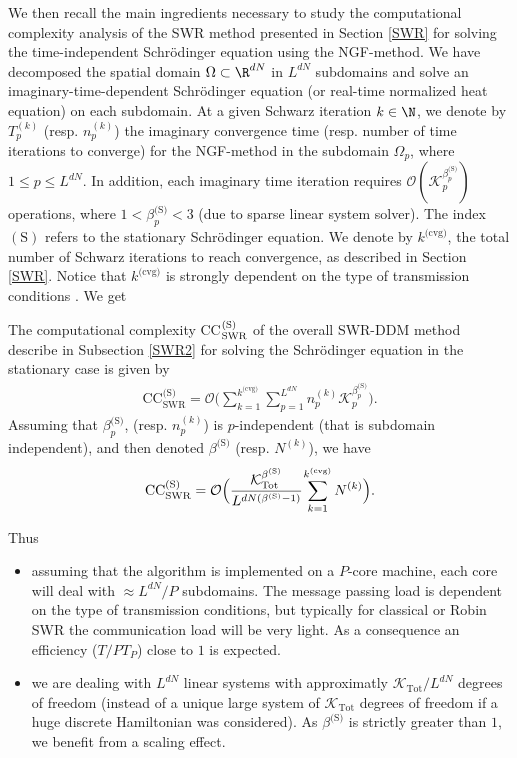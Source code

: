  We then recall the main ingredients necessary to study the computational complexity analysis of the SWR method presented in Section \ref{SWR} for solving the time-independent Schr\"odinger equation using the NGF-method. We have decomposed the spatial domain $\Omega \subset \R^{dN}$ in $L^{dN}$ subdomains and solve an imaginary-time-dependent Schr\"odinger equation (or real-time normalized heat equation) on each subdomain. At a given Schwarz iteration $k \in \N$, we denote by $T^{(k)}_{p}$ (resp. $n_{p}^{(k)}$) the imaginary convergence time (resp. number of time iterations to converge) for the NGF-method in the subdomain $\Omega_{p}$, where $1\leq p \leq L^{dN}$. In addition, each imaginary time iteration requires $\mathcal{O}(\mathcal{K}_{p}^{\beta^{\textrm{(S)}}_p})$ operations, where $1 < \beta^{\textrm{(S)}}_p <  3$ (due to sparse linear system solver). The index $(\textrm{S})$ refers to the stationary Schr\"odinger equation. We denote by $k^{\textrm{(cvg)}}$, the total number of Schwarz iterations to reach convergence, as described in Section \ref{SWR}. Notice that $k^{\textrm{(cvg)}}$ is  strongly dependent on the type of transmission conditions \cite{lorin-TBS2}. We get
\begin{prop} 
The computational complexity CC$^{\textrm{\textrm{(S)}}}_{\textrm{SWR}}$ of the overall SWR-DDM method describe in Subsection \ref{SWR2} for solving the Schr\"odinger equation in the stationary case is given by
\begin{eqnarray}\label{CC2} 
\textrm{CC}^{\textrm{(S)}}_{\textrm{SWR}} = \mathcal{O}\Big(\sum_{k=1}^{k^{\textrm{(cvg)}}}\sum_{p=1}^{L^{dN}}n_{p}^{(k)}\mathcal{K}_p^{\beta^{\textrm{(S)}}_p}\Big).
\end{eqnarray}
Assuming that $\beta^{\textrm{(S)}}_p$, (resp. $n_{p}^{(k)}$) is $p$-independent (that is subdomain independent),  and then denoted $\beta^{\textrm{(S)}}$ (resp. $N^{(k)}$), we have
\begin{eqnarray*}
\textrm{CC}^{\textrm{(S)}}_{\textrm{SWR}} = \mathcal{O}\Big(\cfrac{\mathcal{K}_{\textrm{Tot}}^{\beta^{\textrm{(S)}}}}{L^{dN(\beta^{\textrm{(S)}}-1)}}\sum_{k=1}^{k^{\textrm{(cvg)}}} N^{(k)}\Big).
\end{eqnarray*}
\end{prop}
Thus
\begin{itemize}
\item assuming that the algorithm is implemented on a $P$-core machine, each core will deal with $\approx L^{dN}/P$ subdomains. The message passing load is dependent on the type of transmission conditions, but typically for classical or Robin SWR the communication load will be very light. As a consequence an efficiency ($T/PT_P$) close to $1$ is expected.
\item we are dealing with $L^{dN}$ linear systems with approximatly $\mathcal{K}_{\textrm{Tot}}/L^{dN}$ degrees of freedom (instead of a unique large system of $\mathcal{K}_{\textrm{Tot}}$ degrees of freedom if a huge discrete Hamiltonian was considered). As $\beta^{\textrm{(S)}}$ is strictly greater than $1$, we benefit from a scaling effect. 
\end{itemize}
